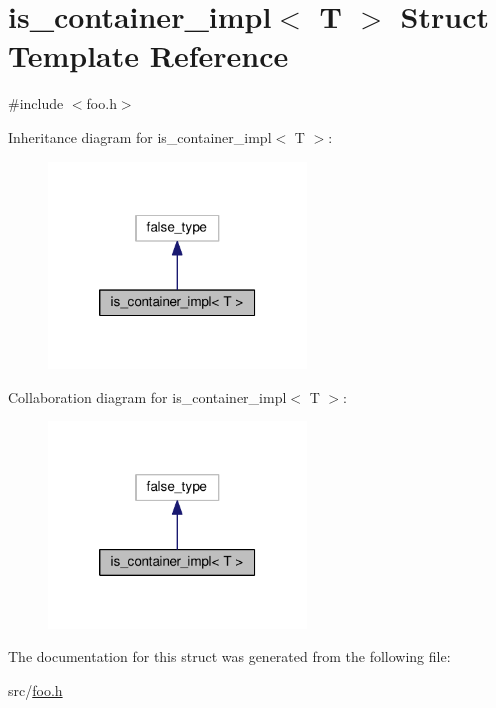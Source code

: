 \hypertarget{structis__container__impl}{\section{is\-\_\-container\-\_\-impl$<$ T $>$ Struct Template Reference}
\label{structis__container__impl}
}


{\ttfamily \#include $<$foo.\-h$>$}



Inheritance diagram for is\-\_\-container\-\_\-impl$<$ T $>$\-:
\nopagebreak
\begin{figure}[H]
\begin{center}
\leavevmode
\includegraphics[width=194pt]{structis__container__impl__inherit__graph}
\end{center}
\end{figure}


Collaboration diagram for is\-\_\-container\-\_\-impl$<$ T $>$\-:
\nopagebreak
\begin{figure}[H]
\begin{center}
\leavevmode
\includegraphics[width=194pt]{structis__container__impl__coll__graph}
\end{center}
\end{figure}


The documentation for this struct was generated from the following file\-:\begin{DoxyCompactItemize}
\item 
src/\hyperlink{foo_8h}{foo.\-h}\end{DoxyCompactItemize}
